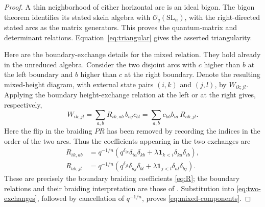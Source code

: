 \documentclass[11pt]{article}
\theoremstyle{remark}
\newcommand{\OO}{\mathcal O_q(\mathrm{SL}_n)}
\newcommand{\ind}{\mathbf 1}
\begin{document}
\begin{proof}
A thin neighborhood of either horizontal arc is an ideal bigon.
The bigon theorem \cite[Theorem~6.3]{LS} identifies its stated skein
algebra with $\OO$, with the right-directed stated arcs as the
matrix generators.  This proves the quantum-matrix and determinant
relations.  Equation~\eqref{eq:triangular} gives the asserted
triangularity.


Here are the boundary-exchange details for the mixed relation.
They hold already in the unreduced algebra.  Consider the two
disjoint arcs with $c$ higher than $b$ at the left boundary and $b$
higher than $c$ at the right boundary.  Denote the resulting
mixed-height diagram, with external state pairs $(i,k)$ and
$(j,l)$, by $W_{ik;jl}$.  Applying the boundary height-exchange
relation at the left or at the right gives, respectively,
\begin{equation}\label{eq:two-exchanges}
 W_{ik;jl}
   =\sum_{a,b}R_{ik,ab}\,b_{aj}c_{bl}
   =\sum_{a,b}c_{kb}b_{ia}\,R_{ab,jl}.
\end{equation}
Here the flip in the braiding $PR$ has been removed by recording
the indices in the order of the two arcs.  Thus the coefficients
appearing in the two exchanges are
\[
 \begin{split}
 R_{ik,ab}
 &=q^{-1/n}\left(
      q^{\delta_{ik}}\delta_{ia}\delta_{kb}
      +\lambda\ind_{k<i}\delta_{ka}\delta_{ib}
   \right),\\
 R_{ab,jl}
 &=q^{-1/n}\left(
      q^{\delta_{jl}}\delta_{aj}\delta_{bl}
      +\lambda\ind_{j<l}\delta_{al}\delta_{bj}
   \right).
 \end{split}
\]
These are precisely the boundary braiding coefficients
\eqref{eq:R}; the boundary relations and their braiding
interpretation are those of \cite[Section~4 and Theorem~6.4]{LS}.
Substitution into \eqref{eq:two-exchanges}, followed by cancellation
of $q^{-1/n}$, proves \eqref{eq:mixed-components}.



\end{proof}
\end{document}
